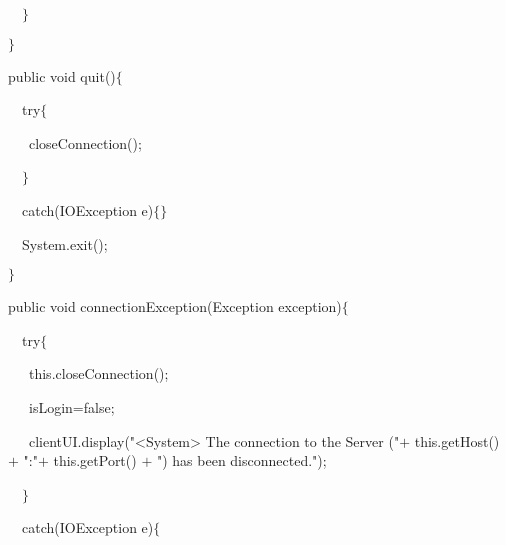 {{\hlstd }{\hlstd\ \ }{\hlstd }{\hlsym $\}$}\leavevmode\par
{\hlstd 	}{\hlsym $\}$}\leavevmode\par
{\hlstd \leavevmode\par
	}{\hlkwa public }{\hlstd }{\hlkwb void }{\hlstd }{\hlkwd quit}{\hlstd }{\hlsym ()$\{$}\leavevmode\par
{\hlstd }{\hlstd\ \ }{\hlstd }{\hlkwa try}{\hlstd }{\hlsym $\{$}\leavevmode\par
{\hlstd }{\hlstd\ \ \ }{\hlstd }{\hlkwd closeConnection}{\hlstd }{\hlsym ();}\leavevmode\par
{\hlstd }{\hlstd\ \ }{\hlstd }{\hlsym $\}$}\leavevmode\par
{\hlstd }{\hlstd\ \ }{\hlstd }{\hlkwa catch}{\hlstd }{\hlsym (}{\hlstd }{\hlkwc IOException }{\hlstd e}{\hlsym )$\{$$\}$}\leavevmode\par
{\hlstd }{\hlstd\ \ }{\hlstd }{\hlkwc System}{\hlstd }{\hlsym .}{\hlstd }{\hlkwd exit}{\hlstd }{\hlsym (}{\hlstd }{}{\hlstd }{\hlsym );}\leavevmode\par
{\hlstd 	}{\hlsym $\}$}\leavevmode\par
{\hlstd \leavevmode\par
	}{\hlkwa public }{\hlstd }{\hlkwb void }{\hlstd }{\hlkwd connectionException}{\hlstd }{\hlsym (}{\hlstd }{\hlkwc Exception }{\hlstd exception}{\hlsym )$\{$}\leavevmode\par
{\hlstd }{\hlstd\ \ }{\hlstd }{\hlkwa try}{\hlstd }{\hlsym $\{$}\leavevmode\par
{\hlstd }{\hlstd\ \ \ }{\hlstd }{\hlkwa this}{\hlstd }{\hlsym .}{\hlstd }{\hlkwd closeConnection}{\hlstd }{\hlsym ();}\leavevmode\par
{\hlstd }{\hlstd\ \ \ }{\hlstd isLogin}{\hlsym $\mathord{=}$}{\hlstd false}{\hlsym ;}\leavevmode\par
{\hlstd }{\hlstd\ \ \ }{\hlstd clientUI}{\hlsym .}{\hlstd }{\hlkwd display}{\hlstd }{\hlsym (}{\hlstd }{\hlstr "$\mathord{<}$System$\mathord{>}$ The connection to the Server ("}{\hlstd  }{\hlsym $\mathord{+}$ }{\hlstd }{\hlkwa this}{\hlstd }{\hlsym .}{\hlstd }{\hlkwd getHost}{\hlstd }{\hlsym () $\mathord{+}$ }{\hlstd }{\hlstr ":"}{\hlstd  }{\hlsym $\mathord{+}$ }{\hlstd }{\hlkwa this}{\hlstd }{\hlsym .}{\hlstd }{\hlkwd getPort}{\hlstd }{\hlsym () $\mathord{+}$ }{\hlstd }{\hlstr ") has been disconnected."}{\hlstd }{\hlsym );}\leavevmode\par
{\hlstd }{\hlstd\ \ }{\hlstd }{\hlsym $\}$}\leavevmode\par
{\hlstd }{\hlstd\ \ }{\hlstd }{\hlkwa catch}{\hlstd }{\hlsym (}{\hlstd }{\hlkwc IOException }{\hlstd e}{\hlsym )$\{$}\leavevmode\par
}
